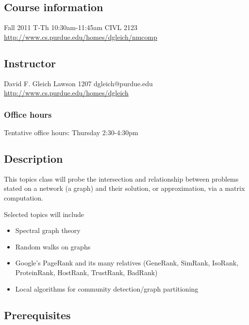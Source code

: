 \documentclass{article}
\begin{document}
 
\hypertarget{course_information_1}{}\subsection*{{Course information}}\label{course_information_1}

Fall 2011 \newline T-Th 10:30am-11:45am \newline CIVL 2123 \newline \url{http://www.cs.purdue.edu/homes/dgleich/nmcomp}

\hypertarget{instructor_2}{}\subsection*{{Instructor}}\label{instructor_2}

David F. Gleich \newline Lawson 1207 \newline dgleich@purdue.edu \newline \url{http://www.cs.purdue.edu/homes/dgleich}

\hypertarget{office_hours_3}{}\subsubsection*{{Office hours}}\label{office_hours_3}

Tentative office hours: Thursday 2:30-4:30pm

\hypertarget{description_4}{}\subsection*{{Description}}\label{description_4}

This topics class will probe the intersection and relationship between problems stated on a network (a graph) and their solution, or approximation, via a matrix computation.

Selected topics will include

\begin{itemize}%
\item Spectral graph theory
\item Random walks on graphs
\item Google'{}s PageRank and its many relatives (GeneRank, SimRank, IsoRank, ProteinRank, HostRank, TrustRank, BadRank)
\item Local algorithms for community detection/graph partitioning

\end{itemize}
\hypertarget{prerequisites_5}{}\subsection*{{Prerequisites}}\label{prerequisites_5}
\end{document}
